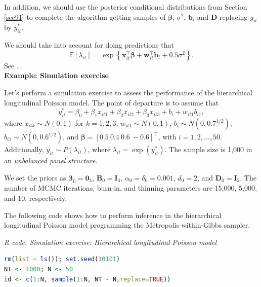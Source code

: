 In addition, we should use the posterior conditional distributions from Section \ref{sec91} to complete the algorithm getting samples of $\bm{\beta}$, $\sigma^2$, $\bm{b}_i$ and $\bm{D}$ replacing $y_{it}$ by ${y}_{it}^*$.

We should take into account for doing predictions that \[\mathbb{E}[{\lambda}_{it}]=\exp\left\{\bm{x}_{it}^{\top}\bm{\beta}+\bm{w}_{it}^{\top}\bm{b}_i+0.5\sigma^2\right\}.\]
See \cite[~pag. 137]{diggle2002analysis}.\\

\textbf{Example: Simulation exercise}

Let's perform a simulation exercise to assess the performance of the hierarchical longitudinal Poisson model. The point of departure is to assume that 
\[
y_{it}^* = \beta_0 + \beta_1 x_{it1} + \beta_2 x_{it2} + \beta_3 x_{it3} + b_i + w_{it1} b_{i1},
\]
where $x_{itk} \sim N(0,1)$ for $k = 1, 2, 3$, $w_{it1} \sim N(0,1)$, $b_i \sim N(0, 0.7^{1/2})$, $b_{i1} \sim N(0, 0.6^{1/2})$, and $\bm{\beta} = [0.5 \ 0.4 \ 0.6 \ -0.6]^{\top}$, with $i = 1, 2, \dots, 50$. Additionally, $y_{it} \sim P(\lambda_{it})$, where $\lambda_{it} = \exp(y_{it}^*)$. The sample size is 1,000 in an \textit{unbalanced panel structure}.

We set the priors as $\bm{\beta}_0 = \bm{0}_4$, $\bm{B}_0 = \bm{I}_4$, $\alpha_0 = \delta_0 = 0.001$, $d_0 = 2$, and $\bm{D}_0 = \bm{I}_2$. The number of MCMC iterations, burn-in, and thinning parameters are 15,000, 5,000, and 10, respectively.

The following code shows how to perform inference in the hierarchical longitudinal Poisson model programming the Metropolis-within-Gibbs sampler.


\begin{tcolorbox}[enhanced,width=4.67in,center upper,
	fontupper=\large\bfseries,drop shadow southwest,sharp corners]
	\textit{R code. Simulation exercise: Hierarchical longitudinal Poisson model}
	\begin{VF}
		\begin{lstlisting}[language=R]
rm(list = ls()); set.seed(10101)
NT <- 1000; N <- 50
id <- c(1:N, sample(1:N, NT - N,replace=TRUE))
\end{lstlisting}
	\end{VF}
\end{tcolorbox}

